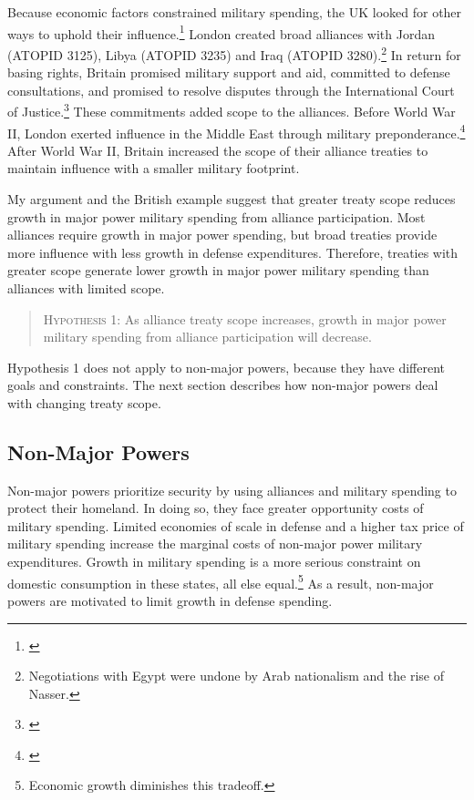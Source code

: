 \documentclass[12pt]{article}
\begin{document}
Because economic factors constrained military spending, the UK looked for other ways to uphold their influence.\footnote{\cite{Monroe1963, Louis1984}}
London created broad alliances with Jordan (ATOPID 3125), Libya (ATOPID 3235) and Iraq (ATOPID 3280).\footnote{Negotiations with Egypt were undone by Arab nationalism and the rise of Nasser.} 
In return for basing rights, Britain promised military support and aid, committed to defense consultations, and promised to resolve disputes through the International Court of Justice.\footnote{\cite{Leedsetal2002}} 
These commitments added scope to the alliances. 
Before World War II, London exerted influence in the Middle East through military preponderance.\footnote{\cite{Monroe1963}}
After World War II, Britain increased the scope of their alliance treaties to maintain influence with a smaller military footprint. 


My argument and the British example suggest that greater treaty scope reduces growth in major power military spending from alliance participation.
Most alliances require growth in major power spending, but broad treaties provide more influence with less growth in defense expenditures. 
Therefore, treaties with greater scope generate lower growth in major power military spending than alliances with limited scope. 


\begin{quote}
\textsc{Hypothesis 1}: As alliance treaty scope increases, growth in major power military spending from alliance participation will decrease. 
\end{quote}


Hypothesis 1 does not apply to non-major powers, because they have different goals and constraints. 
The next section describes how non-major powers deal with changing treaty scope. 


\subsection{Non-Major Powers} 


Non-major powers prioritize security by using alliances and military spending to protect their homeland.  
In doing so, they face greater opportunity costs of military spending. 
Limited economies of scale in defense and a higher tax price of military spending increase the marginal costs of non-major power military expenditures. 
Growth in military spending is a more serious constraint on domestic consumption in these states, all else equal.\footnote{Economic growth diminishes this tradeoff.} 
As a result, non-major powers are motivated to limit growth in defense spending.
\end{document}
